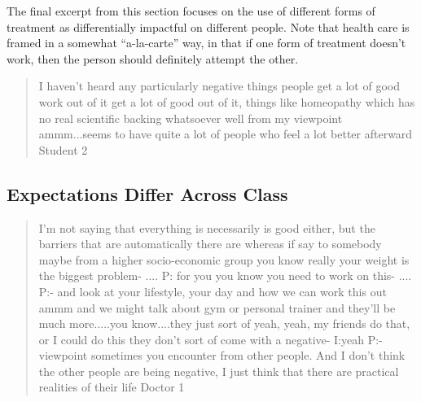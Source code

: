 The final excerpt from this section focuses on the use of different forms of treatment as differentially impactful on different people. Note that health care is framed in a somewhat ``a-la-carte'' way, in that if one form of treatment doesn't work, then the person should definitely attempt the other. 

  

\begin{quotation}
  I haven't heard any particularly negative things people get a lot of good work out of it get a lot of good out of it, things like homeopathy which has no real scientific backing whatsoever well from my viewpoint ammm...seems to have quite a lot of people who feel a lot better afterward
Student 2
\end{quotation}

\subsection{Expectations Differ Across Class}
\label{sec:expect-diff-across}

\begin{quotation}
 I'm not saying that everything is necessarily is good either, but the barriers that are automatically there are whereas if say to somebody maybe from a higher socio-economic group you know really your weight is the biggest problem-
....
P: for you you know you need to work on this-
....
P:- and look at your lifestyle, your day and how we can work this out ammm and we might talk about gym or personal trainer and they'll be much more.....you know....they just sort of yeah, yeah, my friends do that, or I could do this they don't sort of come with a negative-
I:yeah
P:-viewpoint sometimes you encounter from other people. And I don't think the other people are being negative, I just think that there are practical realities of their life
  Doctor 1
\end{quotation}

